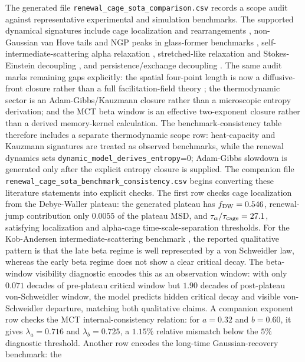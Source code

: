 \documentclass[aps,preprint,onecolumn,superscriptaddress,nofootinbib]{revtex4-2}
\begin{document}
The generated file \texttt{renewal\_cage\_sota\_comparison.csv} records a
scope audit against representative experimental and simulation benchmarks.
The supported dynamical signatures include cage localization and rearrangements
\cite{weeks2002cage,pastore2017cage}, non-Gaussian van Hove tails and NGP
peaks in glass-former benchmarks \cite{kob1995vanhove,guan2014fickian,
rusciano2022fickian}, self-intermediate-scattering alpha relaxation
\cite{kob1995intermediate}, stretched-like relaxation and Stokes-Einstein
decoupling \cite{ediger2000spatial,berthier2011theoretical}, and
persistence/exchange decoupling \cite{hedges2007persistence}. The same audit
marks remaining gaps explicitly: the spatial four-point length is now a
diffusive-front closure rather than a full facilitation-field theory
\cite{lacevic2003fourpoint,berthier2024experimental}; the thermodynamic sector
is an Adam-Gibbs/Kauzmann closure rather than a microscopic entropy derivation;
and the MCT beta window is an effective two-exponent closure rather than a
derived memory-kernel calculation.
The benchmark-consistency table therefore includes a separate thermodynamic
scope row: heat-capacity and Kauzmann signatures are treated as observed
benchmarks, while the renewal dynamics sets
\texttt{dynamic\_model\_derives\_entropy}=0; Adam-Gibbs slowdown is generated
only after the explicit entropy closure is supplied.
The companion file
\texttt{renewal\_cage\_sota\_benchmark\_consistency.csv} begins converting
these literature statements into explicit checks. The first row checks cage
localization from the Debye-Waller plateau: the generated plateau has
$f_{\rm DW}=0.546$, renewal-jump contribution only $0.0055$ of the plateau MSD,
and $\tau_\alpha/\tau_{\rm cage}=27.1$, satisfying localization and
alpha-cage time-scale-separation thresholds. For the Kob-Andersen
intermediate-scattering benchmark \cite{kob1995intermediate}, the reported
qualitative pattern is that the late beta regime is well represented by a von
Schweidler law, whereas the early beta regime does not show a clear critical
decay. The beta-window visibility diagnostic encodes this as an observation
window: with only $0.071$ decades of pre-plateau critical window but $1.90$
decades of post-plateau von-Schweidler window, the model predicts hidden
critical decay and visible von-Schweidler departure, matching both qualitative
claims. A companion exponent row checks the MCT internal-consistency relation:
for $a=0.32$ and $b=0.60$, it gives $\lambda_a=0.716$ and
$\lambda_b=0.725$, a $1.15\%$ relative mismatch below the $5\%$ diagnostic
threshold. Another row encodes the long-time Gaussian-recovery benchmark: the
\end{document}
